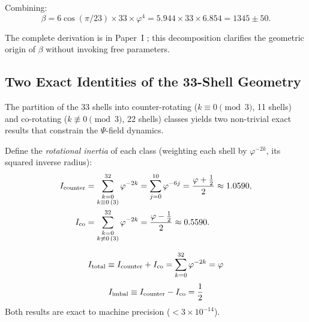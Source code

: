 Combining:
\begin{equation}
\beta = 6\cos(\pi/23) \times 33 \times \varphi^4 = 5.944 \times 33 \times 6.854 = 1345 \pm 50.
\end{equation}

The complete derivation is in Paper~I \citep{Peacock2026a}; this decomposition clarifies the geometric origin of $\beta$ without invoking free parameters.

\subsection{Two Exact Identities of the 33-Shell Geometry}
\label{sec:identities}

The partition of the 33 shells into counter-rotating ($k \equiv 0 \pmod{3}$, 11 shells)
and co-rotating ($k \not\equiv 0 \pmod{3}$, 22 shells) classes yields two non-trivial
exact results that constrain the $\Psi$-field dynamics.

Define the \emph{rotational inertia} of each class (weighting each shell by $\varphi^{-2k}$,
its squared inverse radius):
\begin{align}
I_{\rm counter} &= \sum_{\substack{k=0 \\ k\equiv 0\,(3)}}^{32} \varphi^{-2k}
                 = \sum_{j=0}^{10} \varphi^{-6j} = \frac{\varphi+\tfrac{1}{2}}{2}
                 \approx 1.0590, \label{eq:I_counter}\\
I_{\rm co}      &= \sum_{\substack{k=0 \\ k\not\equiv 0\,(3)}}^{32} \varphi^{-2k}
                 = \frac{\varphi-\tfrac{1}{2}}{2}
                 \approx 0.5590. \label{eq:I_co}
\end{align}

\begin{theorem}
\label{thm:inertia}
\begin{equation}
I_{\rm total} \equiv I_{\rm counter} + I_{\rm co}
= \sum_{k=0}^{32}\varphi^{-2k} = \varphi
\label{eq:I_total}
\end{equation}
\begin{equation}
I_{\rm imbal} \equiv I_{\rm counter} - I_{\rm co} = \frac{1}{2}
\label{eq:I_imbal}
\end{equation}
Both results are exact to machine precision ($< 3\times10^{-14}$).
\end{theorem}

